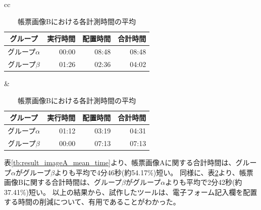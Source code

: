 \begin{table}[t]
	\centering
    \begin{tabular}{cc}
        \begin{minipage}[c]{0.5\hsize}
            \centering
            \caption{帳票画像Aにおける各計測時間の平均}
            \label{tb:result_imageA_mean_time}
            \begin{tabular}{c|rrr}
                グループ & 実行時間 & 配置時間 & 合計時間 \\
                \hline \hline
                グループ$\alpha$ & 00:00 & 08:48 & 08:48 \\
                グループ$\beta$ & 01:26 & 02:36 & 04:02 \\
	        \end{tabular}
        \end{minipage} &
        \begin{minipage}[c]{0.5\hsize}
            \centering
            \caption{帳票画像Bにおける各計測時間の平均}
            \label{tb:result_imageB_mean_time}
            \begin{tabular}{c|rrr}
                グループ & 実行時間 & 配置時間 & 合計時間 \\
                \hline \hline
                グループ$\alpha$ & 01:12 & 03:19 & 04:31 \\
                グループ$\beta$ & 00:00 & 07:13 & 07:13 \\
            \end{tabular}
        \end{minipage}
    \end{tabular}
\end{table}

表\ref{tb:result_imageA_mean_time}より、帳票画像Aに関する合計時間は、グループ$\alpha$がグループ$\beta$よりも平均で4分46秒(約54.17\%)短い。
同様に、表\ref{tb:result_imageB_mean_time}より、帳票画像Bに関する合計時間は、グループ$\beta$がグループ$\alpha$よりも平均で2分42秒(約37.41\%)短い。
以上の結果から、試作したツールは、電子フォーム記入欄を配置する時間の削減について、有用であることがわかった。



